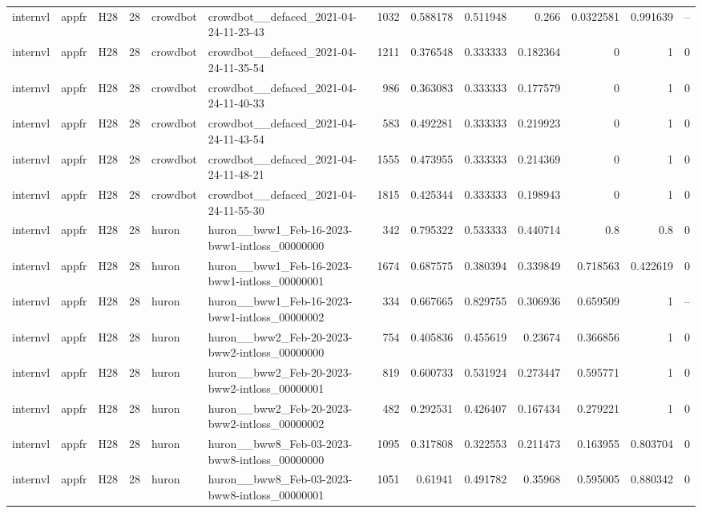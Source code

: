 \begin{longtable}{lllrllrrrrrrr}
internvl & appfr & H28 & 28 & crowdbot & crowdbot\_\_defaced\_2021-04-24-11-23-43 & 1032 & 0.588178 & 0.511948 & 0.266 & 0.0322581 & 0.991639 & -- \\
internvl & appfr & H28 & 28 & crowdbot & crowdbot\_\_defaced\_2021-04-24-11-35-54 & 1211 & 0.376548 & 0.333333 & 0.182364 & 0 & 1 & 0 \\
internvl & appfr & H28 & 28 & crowdbot & crowdbot\_\_defaced\_2021-04-24-11-40-33 & 986 & 0.363083 & 0.333333 & 0.177579 & 0 & 1 & 0 \\
internvl & appfr & H28 & 28 & crowdbot & crowdbot\_\_defaced\_2021-04-24-11-43-54 & 583 & 0.492281 & 0.333333 & 0.219923 & 0 & 1 & 0 \\
internvl & appfr & H28 & 28 & crowdbot & crowdbot\_\_defaced\_2021-04-24-11-48-21 & 1555 & 0.473955 & 0.333333 & 0.214369 & 0 & 1 & 0 \\
internvl & appfr & H28 & 28 & crowdbot & crowdbot\_\_defaced\_2021-04-24-11-55-30 & 1815 & 0.425344 & 0.333333 & 0.198943 & 0 & 1 & 0 \\
internvl & appfr & H28 & 28 & huron & huron\_\_bww1\_Feb-16-2023-bww1-intloss\_00000000 & 342 & 0.795322 & 0.533333 & 0.440714 & 0.8 & 0.8 & 0 \\
internvl & appfr & H28 & 28 & huron & huron\_\_bww1\_Feb-16-2023-bww1-intloss\_00000001 & 1674 & 0.687575 & 0.380394 & 0.339849 & 0.718563 & 0.422619 & 0 \\
internvl & appfr & H28 & 28 & huron & huron\_\_bww1\_Feb-16-2023-bww1-intloss\_00000002 & 334 & 0.667665 & 0.829755 & 0.306936 & 0.659509 & 1 & -- \\
internvl & appfr & H28 & 28 & huron & huron\_\_bww2\_Feb-20-2023-bww2-intloss\_00000000 & 754 & 0.405836 & 0.455619 & 0.23674 & 0.366856 & 1 & 0 \\
internvl & appfr & H28 & 28 & huron & huron\_\_bww2\_Feb-20-2023-bww2-intloss\_00000001 & 819 & 0.600733 & 0.531924 & 0.273447 & 0.595771 & 1 & 0 \\
internvl & appfr & H28 & 28 & huron & huron\_\_bww2\_Feb-20-2023-bww2-intloss\_00000002 & 482 & 0.292531 & 0.426407 & 0.167434 & 0.279221 & 1 & 0 \\
internvl & appfr & H28 & 28 & huron & huron\_\_bww8\_Feb-03-2023-bww8-intloss\_00000000 & 1095 & 0.317808 & 0.322553 & 0.211473 & 0.163955 & 0.803704 & 0 \\
internvl & appfr & H28 & 28 & huron & huron\_\_bww8\_Feb-03-2023-bww8-intloss\_00000001 & 1051 & 0.61941 & 0.491782 & 0.35968 & 0.595005 & 0.880342 & 0 \\

\end{longtable}
